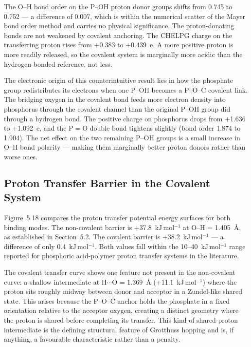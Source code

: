 \documentclass[12pt,a4paper]{report}
\begin{document}
The O--H bond order on the P--OH proton donor groups 
shifts from 0.745 to 0.752 — a difference of 0.007, 
which is within the numerical scatter of the Mayer bond 
order method and carries no physical significance. The 
proton-donating bonds are not weakened by covalent 
anchoring. The CHELPG charge on the transferring proton 
rises from $+$0.383 to $+$0.439~e. A more positive proton 
is more readily released, so the covalent system is 
marginally more acidic than the hydrogen-bonded reference, 
not less.

The electronic origin of this counterintuitive result 
lies in how the phosphate group redistributes its 
electrons when one P--OH becomes a P--O--C covalent link. 
The bridging oxygen in the covalent bond feeds more 
electron density into phosphorus through the covalent 
channel than the original P--OH group did through a 
hydrogen bond. The positive charge on phosphorus drops 
from $+$1.636 to $+$1.092~e, and the P$=$O double bond 
tightens slightly (bond order 1.874 to 1.904). The net 
effect on the two remaining P--OH groups is a small 
increase in O--H bond polarity — making them marginally 
better proton donors rather than worse ones.

\subsection{Proton Transfer Barrier in the Covalent System}

Figure~5.18 compares the proton transfer potential energy 
surfaces for both binding modes. The non-covalent barrier 
is $+$37.8~kJ\,mol\(^{-1}\) at O--H = 1.405~\AA{}, as 
established in Section~5.2. The covalent barrier is 
$+$38.2~kJ\,mol\(^{-1}\) — a difference of only 
0.4~kJ\,mol\(^{-1}\). Both values fall within the 
10--40~kJ\,mol\(^{-1}\) range reported for phosphoric 
acid-polymer proton transfer systems in the literature.

The covalent transfer curve shows one feature not present 
in the non-covalent curve: a shallow intermediate at 
H$\cdots$O = 1.369~\AA{} ($+$11.1~kJ\,mol\(^{-1}\)) 
where the proton sits roughly midway between donor and 
acceptor in a Zundel-like shared state. This arises 
because the P--O--C anchor holds the phosphate in a 
fixed orientation relative to the acceptor oxygen, 
creating a distinct geometry where the proton is shared 
before completing its transfer. This kind of 
shared-proton intermediate is the defining structural 
feature of Grotthuss hopping and is, if anything, 
a favourable characteristic rather than a penalty.
\end{document}
